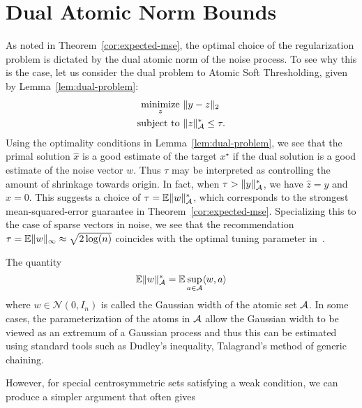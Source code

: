 \section{Dual Atomic Norm Bounds} %
\label{sec:dual-atomic-bounds}

As noted in Theorem~\ref{cor:expected-mse}, the optimal choice of the
regularization problem is dictated by the dual atomic norm of the noise process.
To see why this is the case, let us consider the dual problem to Atomic Soft
Thresholding, given by Lemma~\ref{lem:dual-problem}:
\begin{equation*}
  \begin{split} \mathop{\operatorname{minimize}}_z~&\lVert y - z\rVert_2\\
	 \text{subject to }&\lVert z\rVert_{\mathcal{A}}^* \leq \tau.
  \end{split}
\end{equation*} 
Using the optimality conditions in Lemma~\ref{lem:dual-problem}, we see that the
primal solution $\hat{x}$ is a good estimate of the target $x^\star$ if the dual
solution is a good estimate of the noise vector $w$. Thus $\tau$ may be
interpreted as controlling the amount of shrinkage towards origin. In fact, when
$\tau > \lVert y\rVert_{\mathcal{A}}^*$, we have $\hat{z} = y$ and $\hat{x} = 0.$ This suggests
a choice of $\tau = \operatorname{\mathbb{E}} \lVert w\rVert_{\mathcal{A}}^*$, which corresponds to the strongest
mean-squared-error guarantee in Theorem~\ref{cor:expected-mse}. Specializing
this to the case of sparse vectors in noise, we see that the recommendation $\tau = \operatorname{\mathbb{E}} \lVert w\rVert_\infty \approx \sqrt{2 \log(n)}$ coincides with the optimal tuning parameter in~\cite{donoho1995noising}.

The quantity 
\[
	\operatorname{\mathbb{E}}\lVert w\rVert_{\mathcal{A}}^* = \operatorname{\mathbb{E}}\sup_{a \in \mathcal{A}} \langle w, a\rangle
\]
where $w \in \mathcal{N}(0,I_n)$ is called the Gaussian width of the atomic set $\mathcal{A}$. In some cases, the parameterization of the atoms in $\mathcal{A}$ allow the Gaussian width to be viewed as an extremum of a Gaussian process and thus this can be estimated using standard tools such as Dudley's inequality, Talagrand's method of generic chaining.

However, for special centrosymmetric sets satisfying a weak condition, we can produce a simpler argument that often gives 

